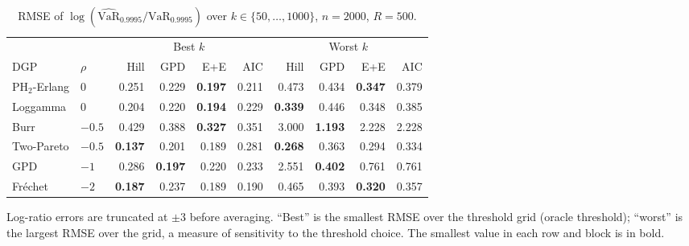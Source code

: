 \begin{table}[t]
\centering
\footnotesize
\setlength{\tabcolsep}{4pt}
\caption{RMSE of $\log(\widehat{\mathrm{VaR}}_{0.9995}/\mathrm{VaR}_{0.9995})$ over $k\in\{50,\dots,1000\}$, $n=2000$, $R=500$.}
\label{tab:q2000}
\begin{tabular}{llrrrrrrrr}
\toprule
 & & \multicolumn{4}{c}{Best $k$} & \multicolumn{4}{c}{Worst $k$} \\
\cmidrule(lr){3-6} \cmidrule(lr){7-10}
DGP & $\rho$ & Hill & GPD & E+E & AIC & Hill & GPD & E+E & AIC \\
\midrule
PH$_2$-Erlang & $0$ & 0.251 & 0.229 & \textbf{0.197} & 0.211 & 0.473 & 0.434 & \textbf{0.347} & 0.379 \\
Loggamma & $0$ & 0.204 & 0.220 & \textbf{0.194} & 0.229 & \textbf{0.339} & 0.446 & 0.348 & 0.385 \\
Burr & $-0.5$ & 0.429 & 0.388 & \textbf{0.327} & 0.351 & 3.000 & \textbf{1.193} & 2.228 & 2.228 \\
Two-Pareto & $-0.5$ & \textbf{0.137} & 0.201 & 0.189 & 0.281 & \textbf{0.268} & 0.363 & 0.294 & 0.334 \\
GPD & $-1$ & 0.286 & \textbf{0.197} & 0.220 & 0.233 & 2.551 & \textbf{0.402} & 0.761 & 0.761 \\
Fr\'echet & $-2$ & \textbf{0.187} & 0.237 & 0.189 & 0.190 & 0.465 & 0.393 & \textbf{0.320} & 0.357 \\
\bottomrule
\end{tabular}
\par\smallskip
\parbox{\linewidth}{\footnotesize Log-ratio errors are truncated at $\pm 3$ before averaging. ``Best'' is the smallest RMSE over the threshold grid (oracle threshold); ``worst'' is the largest RMSE over the grid, a measure of sensitivity to the threshold choice. The smallest value in each row and block is in bold.}
\end{table}
